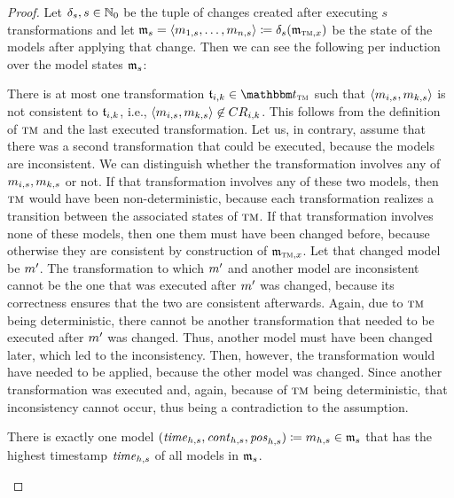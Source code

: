 \begin{proof}
    Let $\mathfrak{\delta}_{s}, s \in \mathbb{N}_0$ be the tuple of changes created after executing $s$ transformations and let $\modeltuple{m}_{s} = \tupled{\model{m}{1,s}, \dots, \model{m}{n,s}}\equalsperdefinition \changetuple{s}(\modeltuple{m}_{\TuringMachine,x})$ be the state of the models after applying that change.
    Then we can see the following per induction over the model states $\modeltuple{m}_{s}$:
	\begin{longenumerate}
        \item 
            There is at most one transformation $\transformation{t}_{i,k} \in \transformationset{T}_{\TuringMachine}$ such that $\tupled{\model{m}{i,s},\model{m}{k,s}}$ is not consistent to $\transformation{t}_{i,k}$, i.e., $\tupled{\model{m}{i,s},\model{m}{k,s}} \not\in \consistencyrelation{CR}{i,k}$.
            This follows from the definition of $\textsc{tm}$ and the last executed transformation.
            Let us, in contrary, assume that there was a second transformation that could be executed, because the models are inconsistent. 
            We can distinguish whether the transformation involves any of $\model{m}{i,s},\model{m}{k,s}$ or not.
            If that transformation involves any of these two models, then $\textsc{tm}$ would have been non-deterministic, because each transformation realizes a transition between the associated states of $\textsc{tm}$.
            If that transformation involves none of these models, then one them must have been changed before, because otherwise they are consistent by construction of $\modeltuple{m}_{\TuringMachine,x}$.
            Let that changed model be $\model{m}{}'$.
            The transformation to which $\model{m}{}'$ and another model are inconsistent cannot be the one that was executed after $\model{m}{}'$ was changed, because its correctness ensures that the two are consistent afterwards.
            Again, due to $\textsc{tm}$ being deterministic, there cannot be another transformation that needed to be executed after $\model{m}{}'$ was changed. 
            Thus, another model must have been changed later, which led to the inconsistency. Then, however, the transformation would have needed to be applied, because the other model was changed.
            Since another transformation was executed and, again, because of $\textsc{tm}$ being deterministic, that inconsistency cannot occur, thus being a contradiction to the assumption.
        \item 
            There is exactly one model $(\mathvariable{time}_{h,s},\mathvariable{cont}_{h,s},\mathvariable{pos}_{h,s}) \equalsperdefinition \model{m}{h,s} \in \modeltuple{m}_{s}$ that has the highest timestamp $\mathit{time}_{h,s}$ of all models in $\modeltuple{m}_{s}$.

\end{longenumerate}
\end{proof}
